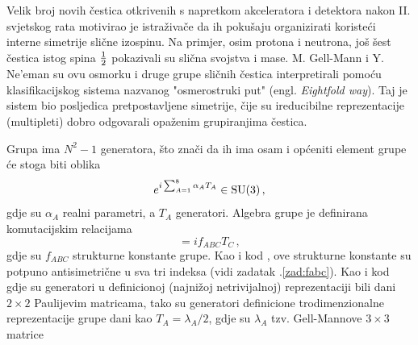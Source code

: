 Velik broj novih čestica otkrivenih s napretkom akceleratora i detektora nakon
II. svjetskog rata motivirao je istraživače da ih pokušaju organizirati
koristeći interne simetrije slične izospinu. Na primjer, osim protona i
neutrona, još šest čestica istog spina $\frac{1}{2}$ pokazivali su slična
svojstva i mase. M. Gell-Mann i Y. Ne'eman su ovu osmorku i druge grupe
sličnih čestica interpretirali pomoću klasifikacijskog sistema nazvanog
"osmerostruki put" (engl. \emph{Eightfold way}). Taj je sistem bio posljedica
pretpostavljene  simetrije, čije su ireducibilne reprezentacije (multipleti) dobro
odgovarali opaženim grupiranjima čestica.

Grupa  ima $N^2-1$ generatora, što znači da ih  ima osam i
općeniti element grupe će stoga biti oblika
\begin{equation}
    e^{i \sum_{A=1}^8 \alpha_A T_{A}} \in \mathrm{SU}(3) \,,
    \label{eq:elsu3}
\end{equation}
gdje su $\alpha_A$ realni parametri, a $T_A$ generatori. Algebra grupe je
definirana komutacijskim relacijama
\begin{equation}
  [ T_{A}, T_{B} ] = i f_{ABC} T_C \,,
\label{eq:SU3}
\end{equation}
gdje su $f_{ABC}$ strukturne konstante grupe. Kao i kod , ove strukturne
konstante su potpuno antisimetrične u sva tri indeksa (vidi zadatak \thechapter.\ref{zad:fabc}).
Kao i kod  gdje su generatori u definicionoj (najnižoj netrivijalnoj)
reprezentaciji bili dani $2\times 2$ Paulijevim matricama, tako su generatori
definicione trodimenzionalne reprezentacije grupe  dani kao
$T_A = \lambda_A/2$, gdje su $\lambda_A$ tzv. Gell-Mannove $3\times 3$ matrice
